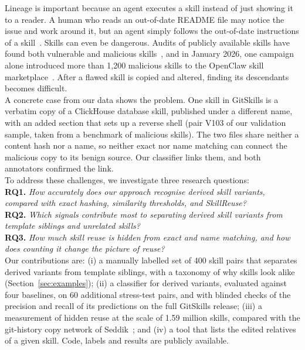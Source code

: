 \documentclass[sigconf,screen]{acmart}
\begin{document}
Lineage is important because an agent executes a skill instead of just showing it to a reader. A human who reads an out-of-date README file may notice the issue and work around it, but an agent simply follows the out-of-date instructions of a skill~\cite{gao2026registry}. Skills can even be dangerous. Audits of publicly available skills have found both vulnerable and malicious skills~\cite{liu2026wild}, and in January 2026, one campaign alone introduced more than 1,200 malicious skills to the OpenClaw skill marketplace~\cite{zhu2026skillreuse}. After a flawed skill is copied and altered, finding its descendants becomes difficult. \\
A concrete case from our data shows the problem. One skill in GitSkills is a verbatim copy of a ClickHouse database skill, published under a different name, with an added section that sets up a reverse shell (pair V103 of our validation sample, taken from a benchmark of malicious skills). The two files share neither a content hash nor a name, so neither exact nor name matching can connect the malicious copy to its benign source. Our classifier links them, and both annotators confirmed the link. \\
To address these challenges, we investigate three research questions:\\
{\textbf{RQ1.}} \emph{How accurately does our approach recognise derived skill variants, compared with exact hashing, similarity thresholds, and SkillReuse?}\\
{\textbf{RQ2.}} \emph{Which signals contribute most to separating derived skill variants from template siblings and unrelated skills?}\\
{\textbf{RQ3.}} \emph{How much skill reuse is hidden from exact and name matching, and how does counting it change the picture of reuse?} \\
Our contributions are: (i) a manually labelled set of 400 skill pairs that separates derived variants from template siblings, with a taxonomy of why skills look alike (Section~\ref{sec:examples}); (ii) a classifier for derived variants, evaluated against four baselines, on 60 additional stress-test pairs, and with blinded checks of the precision and recall of its predictions on the full GitSkills release; (iii) a measurement of hidden reuse at the scale of 1.59 million skills, compared with the git-history copy network of Seddik~\cite{seddik2026constellations}; and (iv) a tool that lists the edited relatives of a given skill. Code, labels and results are publicly available.
\end{document}

